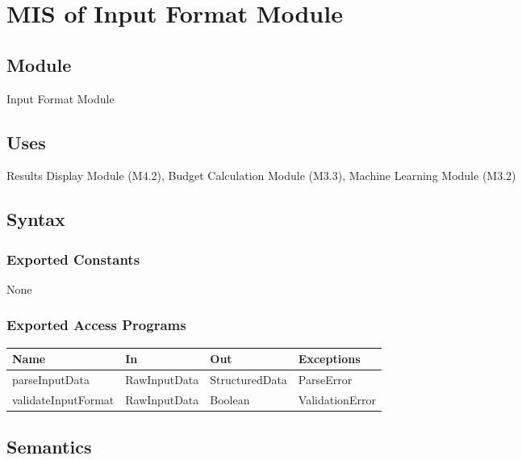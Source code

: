 \documentclass[12pt, titlepage]{article}
\begin{document}
\newpage


\section{MIS of Input Format Module}\label{input_format_module}

\subsection{Module}

Input Format Module

\subsection{Uses}

Results Display Module (M4.2), Budget Calculation Module (M3.3), Machine Learning Module (M3.2)

\subsection{Syntax}

\subsubsection{Exported Constants}

None

\subsubsection{Exported Access Programs}

\begin{center}
\begin{tabular}{p{4cm} p{4cm} p{4cm} p{4cm}}
\hline
\textbf{Name} & \textbf{In} & \textbf{Out} & \textbf{Exceptions} \\
\hline
parseInputData & RawInputData & StructuredData & ParseError \\
\hline
validateInputFormat & RawInputData & Boolean & ValidationError \\
\hline
\end{tabular}
\end{center}

\subsection{Semantics}
\end{document}
